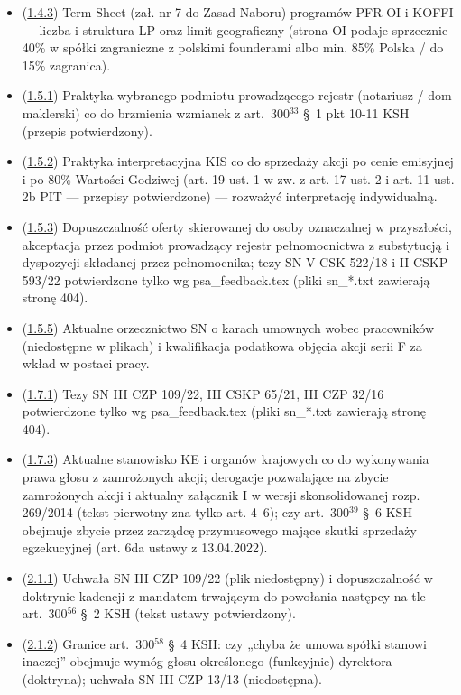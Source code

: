\documentclass[12pt,a4paper]{report}
\begin{document}
\begin{itemize}
  \item (\hyperref[memo:1.4.3]{1.4.3}) Term Sheet (zał. nr 7 do Zasad Naboru) programów PFR OI i KOFFI — liczba i struktura LP oraz limit geograficzny (strona OI podaje sprzecznie 40\% w spółki zagraniczne z polskimi founderami albo min. 85\% Polska / do 15\% zagranica).
  \item (\hyperref[memo:1.5.1]{1.5.1}) Praktyka wybranego podmiotu prowadzącego rejestr (notariusz / dom maklerski) co do brzmienia wzmianek z art.~300$^{33}$ §~1 pkt 10-11 KSH (przepis potwierdzony).
  \item (\hyperref[memo:1.5.2]{1.5.2}) Praktyka interpretacyjna KIS co do sprzedaży akcji po cenie emisyjnej i po 80\% Wartości Godziwej (art. 19 ust. 1 w zw. z art. 17 ust. 2 i art. 11 ust. 2b PIT — przepisy potwierdzone) — rozważyć interpretację indywidualną.
  \item (\hyperref[memo:1.5.3]{1.5.3}) Dopuszczalność oferty skierowanej do osoby oznaczalnej w przyszłości, akceptacja przez podmiot prowadzący rejestr pełnomocnictwa z substytucją i dyspozycji składanej przez pełnomocnika; tezy SN V CSK 522/18 i II CSKP 593/22 potwierdzone tylko wg psa\_feedback.tex (pliki sn\_*.txt zawierają stronę 404).
  \item (\hyperref[memo:1.5.5]{1.5.5}) Aktualne orzecznictwo SN o karach umownych wobec pracowników (niedostępne w plikach) i kwalifikacja podatkowa objęcia akcji serii F za wkład w postaci pracy.
  \item (\hyperref[memo:1.7.1]{1.7.1}) Tezy SN III CZP 109/22, III CSKP 65/21, III CZP 32/16 potwierdzone tylko wg psa\_feedback.tex (pliki sn\_*.txt zawierają stronę 404).
  \item (\hyperref[memo:1.7.3]{1.7.3}) Aktualne stanowisko KE i organów krajowych co do wykonywania prawa głosu z zamrożonych akcji; derogacje pozwalające na zbycie zamrożonych akcji i aktualny załącznik I w wersji skonsolidowanej rozp. 269/2014 (tekst pierwotny zna tylko art. 4–6); czy art.~300$^{39}$ §~6 KSH obejmuje zbycie przez zarządcę przymusowego mające skutki sprzedaży egzekucyjnej (art. 6da ustawy z 13.04.2022).
  \item (\hyperref[memo:2.1.1]{2.1.1}) Uchwała SN III CZP 109/22 (plik niedostępny) i dopuszczalność w doktrynie kadencji z mandatem trwającym do powołania następcy na tle art.~300$^{56}$ §~2 KSH (tekst ustawy potwierdzony).
  \item (\hyperref[memo:2.1.2]{2.1.2}) Granice art.~300$^{58}$ §~4 KSH: czy „chyba że umowa spółki stanowi inaczej” obejmuje wymóg głosu określonego (funkcyjnie) dyrektora (doktryna); uchwała SN III CZP 13/13 (niedostępna).

\end{itemize}
\end{document}
